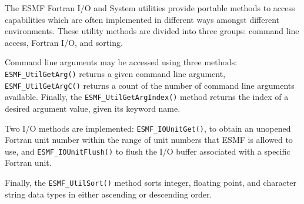 
\label{sec:IOUtil}

\begin{sloppypar}
The ESMF Fortran I/O and System utilities provide portable methods to
access capabilities which are often implemented in different
ways amongst different environments.  These utility methods are
divided into three groups: command line access, Fortran I/O, and
sorting.

Command line arguments may be accessed using three methods:
{\tt ESMF\_UtilGetArg()} returns a given command line argument,
{\tt ESMF\_UtilGetArgC()} returns a count of the number of command line
arguments available.  Finally, the {\tt ESMF\_UtilGetArgIndex()} method
returns the index of a desired argument value, given its keyword name.

Two I/O methods are implemented: {\tt ESMF\_IOUnitGet()},
to obtain an unopened Fortran unit number within the range of unit numbers that
ESMF is allowed to use, and {\tt ESMF\_IOUnitFlush()} to flush the
I/O buffer associated with a specific Fortran unit.

Finally, the {\tt ESMF\_UtilSort()} method sorts integer, floating point,
and character string data types in either ascending or descending order.
\end{sloppypar}

